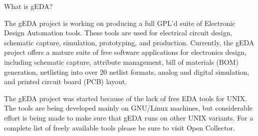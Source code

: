  What is gEDA? 

  The gEDA project is working on producing a full GPL'd suite of Electronic Design Automation tools. These tools are used for electrical circuit design, schematic capture, simulation, prototyping, and production. Currently, the gEDA project offers a mature suite of free software applications for electronics design, including schematic capture, attribute management, bill of materials (BOM) generation, netlisting into over 20 netlist formats, analog and digital simulation, and printed circuit board (PCB) layout. 


  The gEDA project was started because of the lack of free EDA tools for UNIX. The tools are being developed mainly on GNU/Linux machines, but considerable effort is being made to make sure that gEDA runs on other UNIX variants. For a complete list of freely available tools please be sure to visit Open Collector. 
